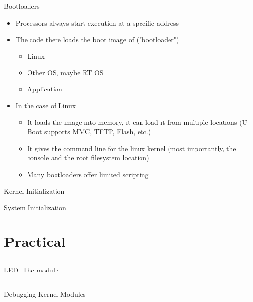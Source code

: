 \documentclass{workshop}
\begin{document}
\subsection{}
\begin{frame}{Bootloaders}
	\begin{itemize}
		\item Processors always start execution at a specific address
		\item The code there loads the boot image of ("bootloader")
			\begin{itemize}
				\item Linux
				\item Other OS, maybe RT OS
				\item Application
			\end{itemize}

		\item In the case of Linux
			\begin{itemize}
				\item It loads the image into memory, it can load it from multiple locations (U-Boot supports MMC, TFTP, Flash, etc.)
				\item It gives the command line for the linux kernel (most importantly, the console and the root filesystem location)
				\item Many bootloaders offer limited scripting 
			\end{itemize}
	\end{itemize}
\end{frame}

\begin{frame}{Kernel Initialization}
\end{frame}

\begin{frame}{System Initialization}
\end{frame}

\section{Practical}

\subsection{}
\begin{frame}{LED. The module.}
\end{frame}

\subsection{}
\begin{frame}{Debugging Kernel Modules}
\end{frame}
\end{document}
